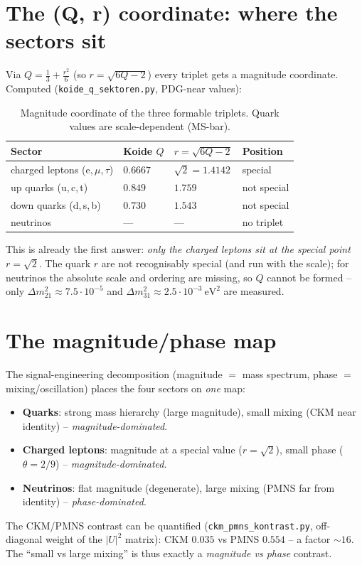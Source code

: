 \section{The (Q, r) coordinate: where the sectors sit}
Via $Q=\tfrac13+\tfrac{r^2}{6}$ (so $r=\sqrt{6Q-2}$) every triplet gets a magnitude coordinate.
Computed (\texttt{koide\_q\_sektoren.py}, PDG-near values):

\begin{table}[htbp]
\centering
\caption{Magnitude coordinate of the three formable triplets. Quark values are scale-dependent (MS-bar).}
\label{tab:qr}
\begin{tabular}{p{5.2cm}p{2.2cm}p{2.4cm}p{2.6cm}}
\toprule
\textbf{Sector} & \textbf{Koide $Q$} & \textbf{$r=\sqrt{6Q-2}$} & \textbf{Position} \\
\midrule
charged leptons (e,\,$\mu$,\,$\tau$) & $0{.}6667$ & $\sqrt2=1{.}4142$ & special \\
up quarks (u,\,c,\,t)                & $0{.}849$  & $1{.}759$         & not special \\
down quarks (d,\,s,\,b)              & $0{.}730$  & $1{.}543$         & not special \\
neutrinos                            & ---        & ---               & no triplet \\
\bottomrule
\end{tabular}
\end{table}

This is already the first answer: \emph{only the charged leptons sit at the special point}
$r=\sqrt2$. The quark $r$ are not recognisably special (and run with the scale); for neutrinos the
absolute scale and ordering are missing, so $Q$ cannot be formed -- only $\Delta m^2_{21}\approx
7{.}5\cdot10^{-5}$ and $\Delta m^2_{31}\approx2{.}5\cdot10^{-3}~\mathrm{eV}^2$ are measured.

\section{The magnitude/phase map}
The signal-engineering decomposition (magnitude $=$ mass spectrum, phase $=$ mixing/oscillation) places
the four sectors on \emph{one} map:
\begin{itemize}
  \item \textbf{Quarks}: strong mass hierarchy (large magnitude), small mixing (CKM near identity)
        -- \emph{magnitude-dominated}.
  \item \textbf{Charged leptons}: magnitude at a special value ($r=\sqrt2$), small phase
        ($\theta=2/9$) -- \emph{magnitude-dominated}.
  \item \textbf{Neutrinos}: flat magnitude (degenerate), large mixing (PMNS far from identity)
        -- \emph{phase-dominated}.
\end{itemize}
The CKM/PMNS contrast can be quantified (\texttt{ckm\_pmns\_kontrast.py}, off-diagonal weight of the
$|U|^2$ matrix): CKM $0{.}035$ vs PMNS $0{.}554$ -- a factor $\sim16$. The \enquote{small vs large
mixing} is thus exactly a \emph{magnitude vs phase} contrast.

